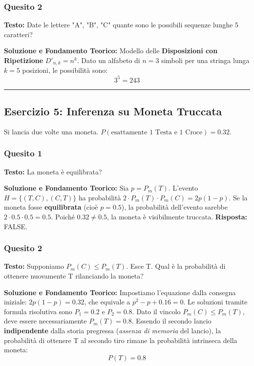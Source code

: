 \documentclass[12pt, a4paper]{article}
\begin{document}
\subsubsection*{Quesito 2}
\textbf{Testo:} Date le lettere "A", "B", "C" quante sono le possibili sequenze lunghe 5 caratteri?

\textbf{Soluzione e Fondamento Teorico:} 
Modello delle \textbf{Disposizioni con Ripetizione} $D'_{n,k} = n^k$. Dato un alfabeto di $n=3$ simboli per una stringa lunga $k=5$ posizioni, le possibilità sono:
$$ 3^5 = 243 $$

\vspace{0.5cm}\hrule\vspace{0.5cm}

\subsection*{Esercizio 5: Inferenza su Moneta Truccata}
Si lancia due volte una moneta. $P(\text{esattamente 1 Testa e 1 Croce}) = 0.32$.

\subsubsection*{Quesito 1}
\textbf{Testo:} La moneta è equilibrata?

\textbf{Soluzione e Fondamento Teorico:} 
Sia $p = P_m(T)$. L'evento $H = \{(T,C), (C,T)\}$ ha probabilità $2 \cdot P_m(T) \cdot P_m(C) = 2p(1-p)$.
Se la moneta fosse \textbf{equilibrata} (cioè $p = 0.5$), la probabilità dell'evento sarebbe $2 \cdot 0.5 \cdot 0.5 = 0.5$. Poiché $0.32 \neq 0.5$, la moneta è visibilmente truccata.
\textbf{Risposta:} FALSE.

\subsubsection*{Quesito 2}
\textbf{Testo:} Supponiamo $P_m(C) \le P_m(T)$. Esce T. Qual è la probabilità di ottenere nuovamente T rilanciando la moneta?

\textbf{Soluzione e Fondamento Teorico:} 
Impostiamo l'equazione dalla consegna iniziale: $2p(1-p) = 0.32$, che equivale a $p^2 - p + 0.16 = 0$.
Le soluzioni tramite formula risolutiva sono $P_1 = 0.2$ e $P_2 = 0.8$.
Dato il vincolo $P_m(C) \le P_m(T)$, deve essere necessariamente $P_m(T) = 0.8$.
Essendo il secondo lancio \textbf{indipendente} dalla storia pregressa (\textit{assenza di memoria} del lancio), la probabilità di ottenere T al secondo tiro rimane la probabilità intrinseca della moneta:
$$ P(T) = 0.8 $$
\end{document}
